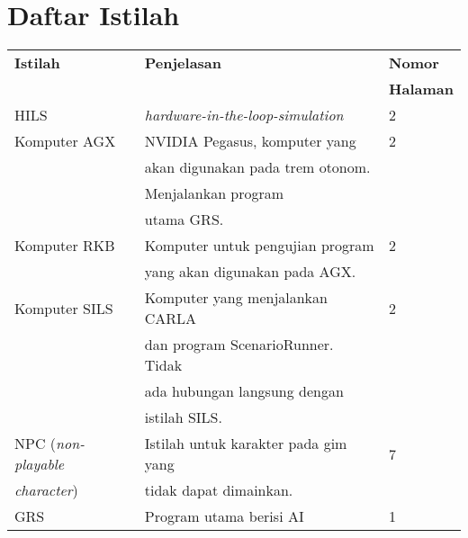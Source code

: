 \chapter*{Daftar Istilah}

\begin{table*}[!ht]
	\centering
	\begin{tabular}{|l|l|l|}
		\hline
		\textbf{Istilah}           & \textbf{Penjelasan}                          & \textbf{Nomor}   \\
		                           &                                              & \textbf{Halaman} \\
		\hline
		HILS                       & \textit{hardware-in-the-loop-simulation}     & 2                \\
		\hline
		Komputer AGX               & NVIDIA Pegasus, komputer yang                & 2                \\
		                           & akan digunakan pada trem otonom.             &                  \\
		                           & Menjalankan program                          &                  \\
		                           & utama GRS.                                   &                  \\
		\hline
		Komputer RKB               & Komputer untuk pengujian program             & 2                \\
		                           & yang akan digunakan pada AGX.                &                  \\
		\hline
		Komputer SILS              & Komputer yang menjalankan CARLA              & 2                \\
		                           & dan program ScenarioRunner. Tidak            &                  \\
		                           & ada hubungan langsung dengan                 &                  \\
		                           & istilah SILS.                                &                  \\
		\hline
		NPC (\textit{non-playable} & Istilah untuk karakter pada gim yang         & 7                \\
		\textit{character})        & tidak dapat dimainkan.                       &                  \\
		\hline
		GRS                        & Program utama berisi AI                      & 1                \\

\end{tabular}
\end{table*}
